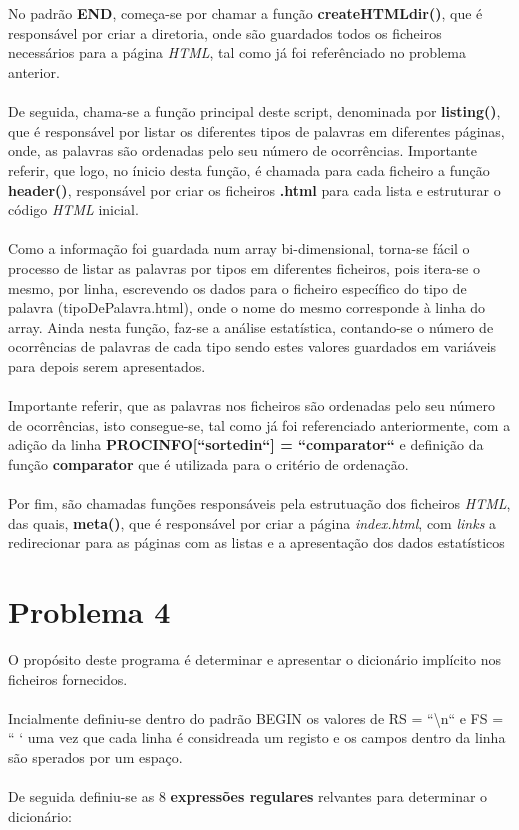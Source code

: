 \documentclass[11pt,a4paper]{report}%
\begin{document}
\\\\No padrão \textbf{END}, começa-se por chamar a função \textbf{createHTMLdir()}, que é responsável por criar a diretoria, onde são guardados todos os ficheiros necessários para a página \emph{HTML}, tal como já foi referênciado no problema anterior.
\\\\De seguida, chama-se a função principal deste script, denominada por \textbf{listing()}, que é responsável por listar os diferentes tipos de palavras em diferentes páginas, onde, as palavras são ordenadas pelo seu número de ocorrências. Importante referir, que logo, no ínicio desta função, é chamada para cada ficheiro a função \textbf{header()}, responsável por criar os ficheiros \textbf{.html} para cada lista e estruturar o código \emph{HTML} inicial.
\\\\Como a informação foi guardada num array bi-dimensional, torna-se fácil o processo de listar as palavras por tipos em diferentes ficheiros, pois itera-se o mesmo, por linha, escrevendo os dados para o ficheiro específico do tipo de palavra (tipoDePalavra.html), onde o nome do mesmo corresponde à linha do array. Ainda nesta função, faz-se a análise estatística, contando-se o número de ocorrências de palavras de cada tipo sendo estes valores guardados em variáveis para depois serem apresentados. \\\\Importante referir, que as palavras nos ficheiros são ordenadas pelo seu número de ocorrências, isto consegue-se, tal como já foi referenciado anteriormente, com a adição da linha \textbf{PROCINFO[``sorted\textunderscore in``] = ``comparator``} e definição da função \textbf{comparator} que é utilizada para o critério de ordenação.
\\\\Por fim, são chamadas funções responsáveis pela estrutuação dos ficheiros \emph{HTML}, das quais, \textbf{meta()}, que é responsável por criar a página \emph{index.html}, com \emph{links} a redirecionar para as páginas com as listas e a apresentação dos dados estatísticos 
\newpage


\section{Problema 4}
O propósito deste programa é determinar e apresentar o dicionário implícito nos ficheiros fornecidos. 
\\\\
Incialmente definiu-se dentro do padrão BEGIN os valores de RS = ``\textbackslash n`` e FS = `` ` uma vez que cada linha é considreada um registo e os campos dentro da linha são sperados por um espaço.
\\\\
De seguida definiu-se as 8 \textbf{expressões regulares} relvantes para determinar o dicionário:
\end{document}

